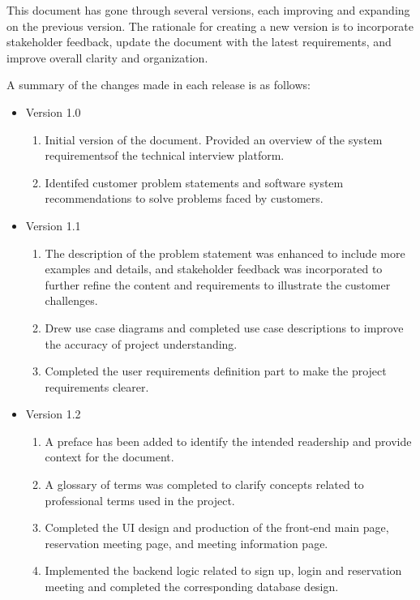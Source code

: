 \documentclass{article}
\begin{document}
This document has gone through several versions, each improving and expanding on the previous 
version. The rationale for creating a new version is to incorporate stakeholder feedback, update 
the document with the latest requirements, and improve overall clarity and organization.

A summary of the changes made in each release is as follows:

\begin{itemize}
    \item Version 1.0
    \begin{enumerate}
        \item Initial version of the document. Provided an overview of the system requirementsof the technical interview platform.
        \item Identifed customer problem statements and software system recommendations to solve problems faced by customers.
    \end{enumerate}
    \item Version 1.1
    \begin{enumerate}
        \item The description of the problem statement was enhanced to include more examples and details, and stakeholder feedback was incorporated to further refine the content and requirements to illustrate the customer challenges.
        \item Drew use case diagrams and completed use case descriptions to improve the accuracy of project understanding.
        \item Completed the user requirements definition part to make the project requirements clearer.
    \end{enumerate}
    \item Version 1.2
    \begin{enumerate}
        \item A preface has been added to identify the intended readership and provide context for the document.
        \item A glossary of terms was completed to clarify concepts related to professional terms used in the project.
        \item Completed the UI design and production of the front-end main page, reservation meeting page, and meeting information page.
        \item Implemented the backend logic related to sign up, login and reservation meeting and completed the corresponding database design.
    \end{enumerate}

\end{itemize}
\end{document}
